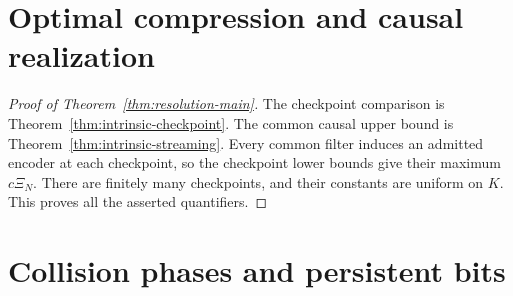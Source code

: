 \section{Optimal compression and causal realization}
\label{sec:direct-classification}

\begin{proof}[Proof of Theorem~\ref{thm:resolution-main}]
The checkpoint comparison is Theorem~\ref{thm:intrinsic-checkpoint}.
The common causal upper bound is Theorem~\ref{thm:intrinsic-streaming}.
Every common filter induces an admitted encoder at each checkpoint,
so the checkpoint lower bounds give their maximum $c\Xi_N$.
There are finitely many checkpoints, and their constants are uniform
on $K$. This proves all the asserted quantifiers.
\end{proof}
\section{Collision phases and persistent bits}
\label{sec:collision-phases}








